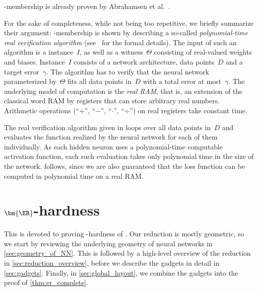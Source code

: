 \documentclass{toc}
\begin{document}
\ER-membership is already proven by Abrahamsen et al.~\cite{Abrahamsen2021_NeuralNetworks}.


For the sake of completeness, while not being too repetitive, we
%
briefly
summarize their argument:
\ER-membership is shown by describing a so-called \emph{polynomial-time real verification algorithm} (see~\cite{Erickson2022_SmoothingTheGap} for the formal details).
The input of such an algorithm is a \trainNN instance~$I$, as well as a witness~$\Theta$ consisting of real-valued weights and biases.
Instance~$I$ consists of a network architecture, data points~$D$ and a target error~$\gamma$.
The algorithm has to verify that the neural network parameterized by~$\Theta$ fits all data points in~$D$ with a total error at most~$\gamma$.
The underlying model of computation is the \emph{real RAM}, that is, an extension of the classical word RAM by registers that can store arbitrary real numbers.
Arithmetic operations (\enquote{$+$}, \enquote{$-$}, \enquote{$\cdot$}, \enquote{$\div$}) on real registers take constant time.

%
The real verification algorithm given in \cite{Abrahamsen2021_NeuralNetworks}
%
%
%
%
%
loops over all data points in~$D$ and evaluates the function realized by the neural network for each of them individually.
As each hidden neuron uses a polynomial-time computable activation function, each such evaluation takes only polynomial time in the size of the network.
 follows, since we are also guaranteed that the loss function can be computed in polynomial time on a real RAM.




\section{\texorpdfstring{$\bm{{\ER}}$}{ER}-hardness}
\label{sec:hardness}

This  is devoted to proving \ER-hardness of \trainNN.
Our reduction is mostly geometric, so we start by reviewing the underlying geometry of \twolayer neural networks in \cref{sec:geometry_of_NN}.
This is followed by a high-level overview of the reduction in \cref{sec:reduction_overview}, before we describe the gadgets in detail in \cref{sec:gadgets}.
Finally, in \cref{sec:global_layout}, we combine the gadgets into the proof of \cref{thm:er_complete}.
\end{document}
